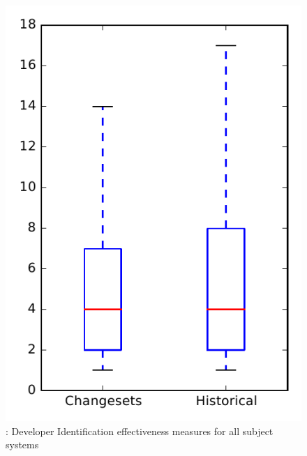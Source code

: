 
\begin{figure}
\centering
\includegraphics[height=0.4\textheight]{figures/dit/rq2_overview_no_outlier}
\caption{\dtwo: Developer Identification effectiveness measures for all subject systems}
\label{fig:dit:rq2:overview}
\end{figure}

